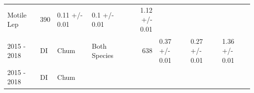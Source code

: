 \documentclass[fleqn,10pt]{wlpeerj} %
\begin{document}
\begin{longtable}[]{@{}llllrlll@{}}
\begin{minipage}[t]{0.11\columnwidth}
Motile Lep\strut
\end{minipage} & \begin{minipage}[t]{0.04\columnwidth}\raggedleft\strut
390\strut
\end{minipage} & \begin{minipage}[t]{0.14\columnwidth}\raggedright\strut
0.11 +/- 0.01\strut
\end{minipage} & \begin{minipage}[t]{0.14\columnwidth}\raggedright\strut
0.1 +/- 0.01\strut
\end{minipage} & \begin{minipage}[t]{0.14\columnwidth}\raggedright\strut
1.12 +/- 0.01\strut
\end{minipage}\tabularnewline
\begin{minipage}[t]{0.09\columnwidth}\raggedright\strut
2015 - 2018\strut
\end{minipage} & \begin{minipage}[t]{0.06\columnwidth}\raggedright\strut
DI\strut
\end{minipage} & \begin{minipage}[t]{0.06\columnwidth}\raggedright\strut
Chum\strut
\end{minipage} & \begin{minipage}[t]{0.11\columnwidth}\raggedright\strut
Both Species\strut
\end{minipage} & \begin{minipage}[t]{0.04\columnwidth}\raggedleft\strut
638\strut
\end{minipage} & \begin{minipage}[t]{0.14\columnwidth}\raggedright\strut
0.37 +/- 0.01\strut
\end{minipage} & \begin{minipage}[t]{0.14\columnwidth}\raggedright\strut
0.27 +/- 0.01\strut
\end{minipage} & \begin{minipage}[t]{0.14\columnwidth}\raggedright\strut
1.36 +/- 0.01\strut
\end{minipage}\tabularnewline
\begin{minipage}[t]{0.09\columnwidth}\raggedright\strut
2015 - 2018\strut
\end{minipage} & \begin{minipage}[t]{0.06\columnwidth}\raggedright\strut
DI\strut
\end{minipage} & \begin{minipage}[t]{0.06\columnwidth}\raggedright\strut
Chum\strut
\end{minipage} & \begin{minipage}[t]{0.11\columnwidth}\raggedright\strut

\end{minipage}
\end{longtable}
\end{document}
